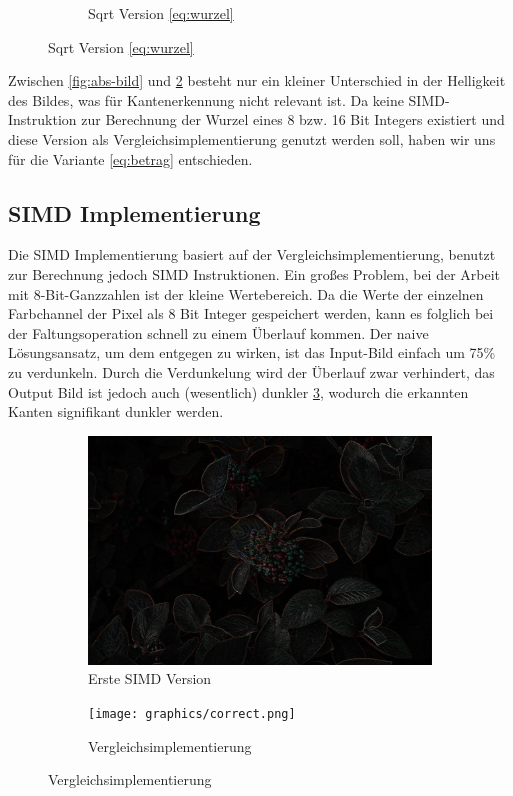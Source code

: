 \documentclass[course=erap]{aspdoc}
\begin{document}
\begin{figure}[H]
\begin{subfigure}{.5\columnwidth}
        \caption{Sqrt Version \ref{eq:wurzel}}
        \label{fig:sqrt-bild}
    \end{subfigure}
\end{figure}
Zwischen {\ref{fig:abs-bild}} und {\ref{fig:sqrt-bild}} besteht nur ein kleiner Unterschied in der Helligkeit des Bildes, was für Kantenerkennung nicht relevant ist.
Da keine SIMD-Instruktion zur Berechnung der Wurzel eines 8 bzw. 16 Bit Integers existiert und diese Version als Vergleichsimplementierung genutzt werden soll, haben wir uns für die Variante {\ref{eq:betrag}} entschieden.
\subsection{SIMD Implementierung}
Die SIMD Implementierung basiert auf der Vergleichsimplementierung, benutzt zur Berechnung jedoch SIMD Instruktionen.
Ein großes Problem, bei der Arbeit mit 8-Bit-Ganzzahlen ist der kleine Wertebereich.
Da die Werte der einzelnen Farbchannel der Pixel als 8 Bit Integer gespeichert werden, kann es folglich bei der Faltungsoperation schnell zu einem Überlauf kommen.
Der naive Lösungsansatz, um dem entgegen zu wirken, ist das Input-Bild einfach um 75\% zu verdunkeln.
Durch die Verdunkelung wird der Überlauf zwar verhindert, das Output Bild ist jedoch auch (wesentlich) dunkler {\ref{fig:dark}}, wodurch die erkannten Kanten signifikant dunkler werden.
\begin{figure}[H]
    \begin{subfigure}{.5\columnwidth}
        \centering
        \includegraphics[width=\columnwidth]{graphics/dark.png}
        \caption{Erste SIMD Version}
        \label{fig:dark}
    \end{subfigure}
    \begin{subfigure}{.5\columnwidth}
        \centering
        \texttt{[image: graphics/correct.png]}
        \caption{Vergleichsimplementierung}
        \label{fig:correct}
    \end{subfigure}
\end{figure}
\end{document}
